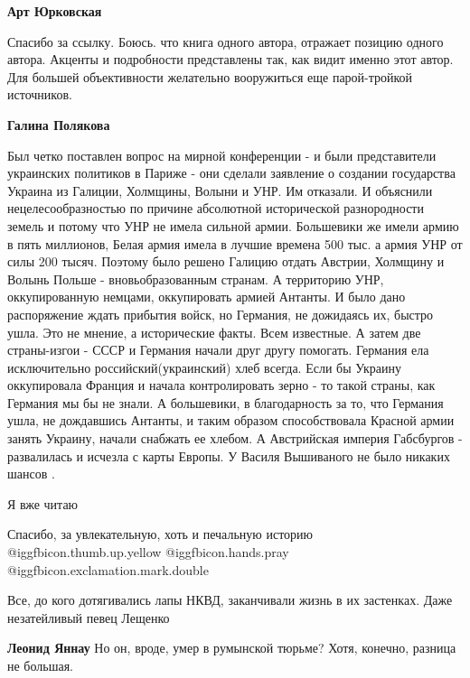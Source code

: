 \begin{itemize}
\begin{itemize}
\begin{itemize}
\textbf{Арт Юрковская} 

Спасибо за ссылку. Боюсь. что книга одного автора, отражает позицию одного
автора. Акценты и подробности представлены так, как видит именно этот автор.
Для большей объективности желательно вооружиться еще парой-тройкой источников.

\textbf{Галина Полякова} 

Был четко поставлен вопрос на мирной конференции - и были представители
украинских политиков в Париже - они сделали заявление о создании государства
Украина из Галиции, Холмщины, Волыни и УНР. Им отказали. И объяснили
нецелесообразностью по причине абсолютной исторической разнородности земель и
потому что УНР не имела сильной армии. Большевики же имели армию в пять
миллионов, Белая армия имела в лучшие времена 500 тыс. а армия УНР от силы 200
тысяч. Поэтому было решено Галицию отдать Австрии, Холмщину и Волынь Польше -
вновьобразованным странам. А территорию УНР, оккупированную немцами,
оккупировать армией Антанты. И было дано распоряжение ждать прибытия войск, но
Германия, не дожидаясь их, быстро ушла. Это не мнение, а исторические факты. Всем
известные. А затем две страны-изгои - СССР и Германия начали друг другу
помогать. Германия ела исключительно российский(украинский) хлеб всегда. Если бы
Украину оккупировала Франция и начала контролировать зерно - то такой страны, 
как Германия мы бы не знали. А большевики, в благодарность за то, что Германия
ушла, не дождавшись Антанты, и таким образом способствовала Красной армии занять
Украину, начали снабжать ее хлебом. А Австрийская империя Габсбургов -
развалилась и исчезла с карты Европы. У Василя Вышиваного не было никаких шансов
.

\end{itemize} %

\end{itemize} %

Я вже читаю

Спасибо, за увлекательную, хоть и печальную историю  
@igg{fbicon.thumb.up.yellow}  @igg{fbicon.hands.pray} @igg{fbicon.exclamation.mark.double}

Все, до кого дотягивались лапы НКВД, заканчивали жизнь в их застенках. Даже незатейливый певец Лещенко

\begin{itemize} %
\textbf{Леонид Яннау} Но он, вроде, умер в румынской тюрьме? Хотя, конечно, разница не большая.


\end{itemize}
\end{itemize}
